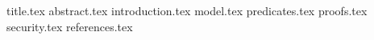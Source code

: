 \documentclass[11pt]{llncs}
\begin{document}
{title.tex}
\thispagestyle{plain}
{abstract.tex}
{introduction.tex}
{model.tex}
{predicates.tex}
{proofs.tex}
{security.tex}
{references.tex}
\end{document}
